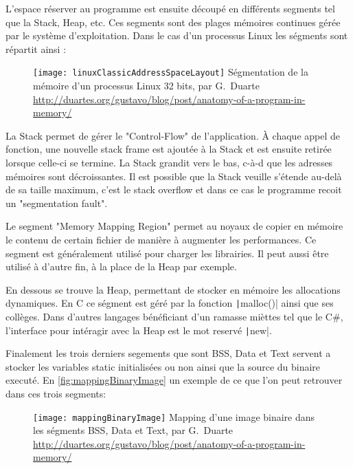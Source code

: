 L'espace réserver au programme est ensuite découpé en différents segments tel que la Stack, Heap, etc. Ces segments sont des plages mémoires continues gérée par le système d'exploitation. Dans le cas d'un processus Linux les ségments sont répartit ainsi :

\begin{figure}[H]
	\centering
	\texttt{[image: linuxClassicAddressSpaceLayout]}
	{Ségmentation de la mémoire d'un processus Linux 32 bits, par G.~Duarte}
	{\url{http://duartes.org/gustavo/blog/post/anatomy-of-a-program-in-memory/}}
	\label{fig:linuxClassicAddressSpaceLayout}
\end{figure}

La Stack permet de gérer le "Control-Flow" de l'application. À chaque appel de fonction, une nouvelle stack frame est ajoutée à la Stack et est ensuite retirée lorsque celle-ci se termine. La Stack grandit vers le bas, c-à-d que les adresses mémoires sont décroissantes. Il est possible que la Stack veuille s'étende au-delà de sa taille maximum, c'est le stack overflow et dans ce cas le programme recoit un "segmentation fault".

Le segment "Memory Mapping Region" permet au noyaux de copier en mémoire le contenu de certain fichier de manière à augmenter les performances. Ce segment est généralement utilisé pour charger les librairies. Il peut aussi être utilisé à d'autre fin, à la place de la Heap par exemple.

En dessous se trouve la Heap, permettant de stocker en mémoire les allocations dynamiques. En C ce ségment est géré par la fonction \texttt|malloc()| ainsi que ses collèges. Dans d'autres langages bénéficiant d'un ramasse mièttes tel que le C\#, l'interface pour intéragir avec la Heap est le mot reservé \texttt|new|.

Finalement les trois derniers segements que sont BSS, Data et Text servent a stocker les variables static initialisées ou non ainsi que la source du binaire executé. En \autoref{fig:mappingBinaryImage} un exemple de ce que l'on peut retrouver dans ces trois segments:

\begin{figure}[H]
	\centering
	\texttt{[image: mappingBinaryImage]}
	{Mapping d'une image binaire dans les ségments BSS, Data et Text, par G.~Duarte}
	{\url{http://duartes.org/gustavo/blog/post/anatomy-of-a-program-in-memory/}}
	\label{fig:mappingBinaryImage}
\end{figure}


